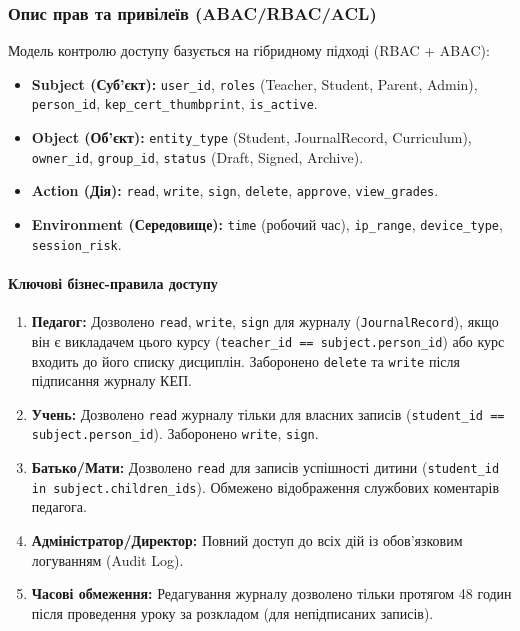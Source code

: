 \documentclass{article}
\begin{document}
\subsubsection{Опис прав та привілеїв (ABAC/RBAC/ACL)}
Модель контролю доступу базується на гібридному підході (RBAC + ABAC):
\begin{itemize}
    \item \textbf{Subject (Суб'єкт):} \texttt{user\_id}, \texttt{roles} (Teacher, Student, Parent, Admin), \texttt{person\_id}, \texttt{kep\_cert\_thumbprint}, \texttt{is\_active}.
    \item \textbf{Object (Об'єкт):} \texttt{entity\_type} (Student, JournalRecord, Curriculum), \texttt{owner\_id}, \texttt{group\_id}, \texttt{status} (Draft, Signed, Archive).
    \item \textbf{Action (Дія):} \texttt{read}, \texttt{write}, \texttt{sign}, \texttt{delete}, \texttt{approve}, \texttt{view\_grades}.
    \item \textbf{Environment (Середовище):} \texttt{time} (робочий час), \texttt{ip\_range}, \texttt{device\_type}, \texttt{session\_risk}.
\end{itemize}

\paragraph{Ключові бізнес-правила доступу}
\begin{enumerate}
    \item \textbf{Педагог:} Дозволено \texttt{read}, \texttt{write}, \texttt{sign} для журналу (\texttt{JournalRecord}), якщо він є викладачем цього курсу (\texttt{teacher\_id == subject.person\_id}) або курс входить до його списку дисциплін. Заборонено \texttt{delete} та \texttt{write} після підписання журналу КЕП.
    \item \textbf{Учень:} Дозволено \texttt{read} журналу тільки для власних записів (\texttt{student\_id == subject.person\_id}). Заборонено \texttt{write}, \texttt{sign}.
    \item \textbf{Батько/Мати:} Дозволено \texttt{read} для записів успішності дитини (\texttt{student\_id in subject.children\_ids}). Обмежено відображення службових коментарів педагога.
    \item \textbf{Адміністратор/Директор:} Повний доступ до всіх дій із обов'язковим логуванням (Audit Log).
    \item \textbf{Часові обмеження:} Редагування журналу дозволено тільки протягом 48 годин після проведення уроку за розкладом (для непідписаних записів).
\end{enumerate}
\end{document}
